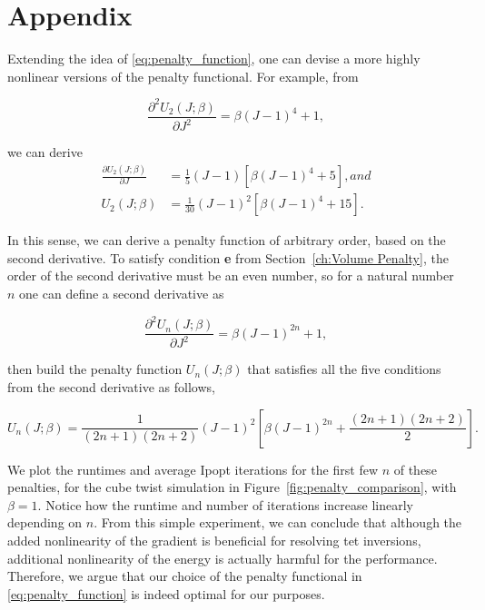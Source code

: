 \chapter{Appendix}
\label{ap: Penalty}

Extending the idea of \eqref{eq:penalty_function}, one can devise a more highly nonlinear versions of the penalty functional. For example, from

\begin{equation}
\frac{\partial^2 U_2(J;\beta)}{\partial J^2} = \beta(J-1)^4 + 1,
\end{equation}

we can derive 
\begin{align}
\frac{\partial U_2(J;\beta)}{\partial J} &= \frac{1}{5} (J-1) \left[ \beta(J-1)^4 + 5 \right], and \\
U_2(J;\beta) &= \frac{1}{30} (J-1)^2 \left[ \beta (J-1)^4 + 15 \right].
\end{align}

In this sense, we can derive a penalty function of arbitrary order, based on the second derivative. To satisfy condition \textbf{e} from Section~\ref{ch:Volume Penalty}, the order of the second derivative must be an even number, so for a natural number $n$ one can define a second derivative as

\begin{equation}
\frac{\partial^2 U_n(J;\beta)}{\partial J^2} = \beta(J-1)^{2n} + 1,
\end{equation}

then build the penalty function $U_n(J; \beta)$ that satisfies all the five conditions from the second derivative as follows,

\begin{equation}
U_n(J;\beta) = \frac{1}{(2n+1)(2n+2)} (J-1)^2 \left[ \beta (J-1)^{2n} + \frac{(2n+1)(2n+2)}{2} \right].
\end{equation}

We plot the runtimes and average Ipopt iterations for the first few $n$ of these penalties, for the cube twist simulation in Figure~\ref{fig:penalty_comparison}, with $\beta = 1$.
Notice how the runtime and number of iterations increase linearly depending on $n$. 
From this simple experiment, we can conclude that although the added nonlinearity of the gradient is beneficial for resolving tet inversions, additional nonlinearity of the energy is actually harmful for the performance. Therefore, we argue that our choice of the penalty functional in \eqref{eq:penalty_function} is indeed optimal for our purposes.

